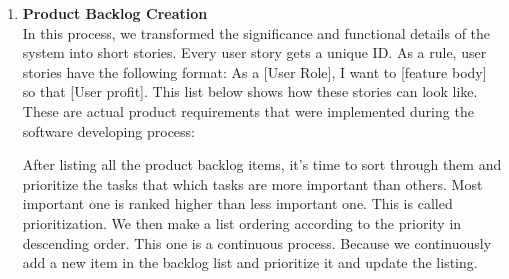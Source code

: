 \begin{enumerate}
\item \textbf{Product Backlog Creation}\\
In this process, we transformed the significance and functional details of the system into short stories. Every user story gets a unique ID. As a rule, user stories have the following format: As a [User Role], I want to [feature body] so that [User profit]. This list below shows how these stories can look like. These are actual product requirements that were implemented during the software developing process:
\begin{table}[h]
\centering
\huge
{}
\caption{\label{tab:userStory}User story example.}
\end{table}

After listing all the product backlog items, it's time to sort through them and prioritize the tasks that which tasks are more important than others. Most important one is ranked higher than less important one. This is called prioritization. We then make a list ordering according to the priority in descending order. This one is a continuous process. Because we continuously add a new item in the backlog list and prioritize it and update the listing.




\end{enumerate}
